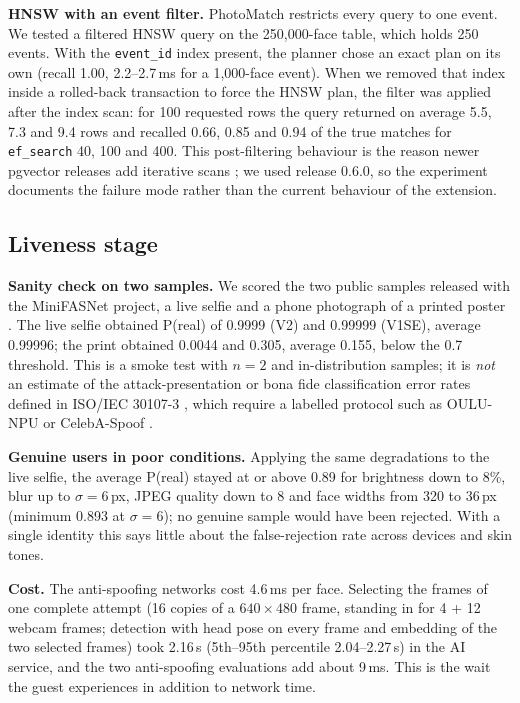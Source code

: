 \documentclass[conference]{IEEEtran}
\begin{document}
\textbf{HNSW with an event filter.} PhotoMatch restricts every query to one event. We tested a filtered HNSW query on the 250,000-face table, which holds 250 events. With the \texttt{event\_id} index present, the planner chose an exact plan on its own (recall 1.00, 2.2--2.7\,ms for a 1,000-face event). When we removed that index inside a rolled-back transaction to force the HNSW plan, the filter was applied after the index scan: for 100 requested rows the query returned on average 5.5, 7.3 and 9.4 rows and recalled 0.66, 0.85 and 0.94 of the true matches for \texttt{ef\_search} 40, 100 and 400. This post-filtering behaviour is the reason newer pgvector releases add iterative scans \cite{pgvector08}; we used release 0.6.0, so the experiment documents the failure mode rather than the current behaviour of the extension.

\subsection{Liveness stage}
\textbf{Sanity check on two samples.} We scored the two public samples released with the MiniFASNet project, a live selfie and a phone photograph of a printed poster \cite{minivision}. The live selfie obtained P(real) of 0.9999 (V2) and 0.99999 (V1SE), average 0.99996; the print obtained 0.0044 and 0.305, average 0.155, below the 0.7 threshold. This is a smoke test with $n=2$ and in-distribution samples; it is \emph{not} an estimate of the attack-presentation or bona fide classification error rates defined in ISO/IEC 30107-3 \cite{iso30107}, which require a labelled protocol such as OULU-NPU \cite{boulkenafet2017oulu} or CelebA-Spoof \cite{zhang2020celebaspoof}.

\textbf{Genuine users in poor conditions.} Applying the same degradations to the live selfie, the average P(real) stayed at or above 0.89 for brightness down to 8\%, blur up to $\sigma=6$\,px, JPEG quality down to 8 and face widths from 320 to 36\,px (minimum 0.893 at $\sigma=6$); no genuine sample would have been rejected. With a single identity this says little about the false-rejection rate across devices and skin tones.

\textbf{Cost.} The anti-spoofing networks cost 4.6\,ms per face. Selecting the frames of one complete attempt (16 copies of a $640\times480$ frame, standing in for 4 + 12 webcam frames; detection with head pose on every frame and embedding of the two selected frames) took 2.16\,s (5th--95th percentile 2.04--2.27\,s) in the AI service, and the two anti-spoofing evaluations add about 9\,ms. This is the wait the guest experiences in addition to network time.
\end{document}
